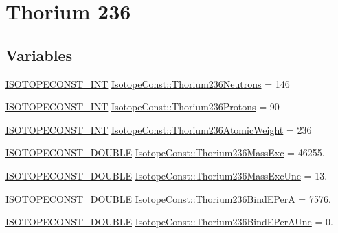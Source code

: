 \hypertarget{group___isotope_const-_thorium-_th236}{}\section{Thorium 236}
\label{group___isotope_const-_thorium-_th236}
\subsection*{Variables}
\begin{DoxyCompactItemize}
\item 
\mbox{\hyperlink{group___isotope_const-_macros_ga5f18360b3e99483a35c32d789e62621c}{I\+S\+O\+T\+O\+P\+E\+C\+O\+N\+S\+T\+\_\+\+I\+NT}} \mbox{\hyperlink{group___isotope_const-_thorium-_th236_ga94688f82c76c667993070af95b74ba1e}{Isotope\+Const\+::\+Thorium236\+Neutrons}} = 146
\item 
\mbox{\hyperlink{group___isotope_const-_macros_ga5f18360b3e99483a35c32d789e62621c}{I\+S\+O\+T\+O\+P\+E\+C\+O\+N\+S\+T\+\_\+\+I\+NT}} \mbox{\hyperlink{group___isotope_const-_thorium-_th236_gac0cf2519b1bd1f60da8381ca141f2c15}{Isotope\+Const\+::\+Thorium236\+Protons}} = 90
\item 
\mbox{\hyperlink{group___isotope_const-_macros_ga5f18360b3e99483a35c32d789e62621c}{I\+S\+O\+T\+O\+P\+E\+C\+O\+N\+S\+T\+\_\+\+I\+NT}} \mbox{\hyperlink{group___isotope_const-_thorium-_th236_ga8338cb40d5db219d43241ceece0974d4}{Isotope\+Const\+::\+Thorium236\+Atomic\+Weight}} = 236
\item 
\mbox{\hyperlink{group___isotope_const-_macros_ga8f45a7272ce02c0b4c65c44636ed719a}{I\+S\+O\+T\+O\+P\+E\+C\+O\+N\+S\+T\+\_\+\+D\+O\+U\+B\+LE}} \mbox{\hyperlink{group___isotope_const-_thorium-_th236_ga5062b359ce01e51490098dc1c5a311f6}{Isotope\+Const\+::\+Thorium236\+Mass\+Exc}} = 46255.
\item 
\mbox{\hyperlink{group___isotope_const-_macros_ga8f45a7272ce02c0b4c65c44636ed719a}{I\+S\+O\+T\+O\+P\+E\+C\+O\+N\+S\+T\+\_\+\+D\+O\+U\+B\+LE}} \mbox{\hyperlink{group___isotope_const-_thorium-_th236_ga07095e4f819a611d1841e18ec58828d3}{Isotope\+Const\+::\+Thorium236\+Mass\+Exc\+Unc}} = 13.
\item 
\mbox{\hyperlink{group___isotope_const-_macros_ga8f45a7272ce02c0b4c65c44636ed719a}{I\+S\+O\+T\+O\+P\+E\+C\+O\+N\+S\+T\+\_\+\+D\+O\+U\+B\+LE}} \mbox{\hyperlink{group___isotope_const-_thorium-_th236_ga950d1c797a6df03d88bff36d3b6d4167}{Isotope\+Const\+::\+Thorium236\+Bind\+E\+PerA}} = 7576.
\item 
\mbox{\hyperlink{group___isotope_const-_macros_ga8f45a7272ce02c0b4c65c44636ed719a}{I\+S\+O\+T\+O\+P\+E\+C\+O\+N\+S\+T\+\_\+\+D\+O\+U\+B\+LE}} \mbox{\hyperlink{group___isotope_const-_thorium-_th236_ga3e9a169f13a0b5f1d14e7b9478aeb554}{Isotope\+Const\+::\+Thorium236\+Bind\+E\+Per\+A\+Unc}} = 0.

\end{DoxyCompactItemize}
